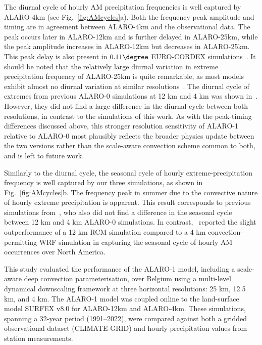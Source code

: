 \documentclass[journal abbreviation, manuscript]{copernicus}
\begin{document}
The diurnal cycle of hourly AM precipitation frequencies is well captured by ALARO-4km (see Fig.~\ref{fig:AMcycles}a).
Both the frequency peak amplitude and timing are in agreement between ALARO-4km and the observational data.
The peak occurs later in ALARO-12km and is further delayed in ALARO-25km, while the peak amplitude increases in ALARO-12km but decreases in ALARO-25km.
This peak delay is also present in $0.11\degree$ EURO-CORDEX simulations~\citep{meredith_present_2021}.
It should be noted that the relatively large diurnal variation in extreme precipitation frequency of ALARO-25km is quite remarkable, as most models exhibit almost no diurnal variation at similar resolutions~\citep{meredith_present_2021, thomassen_spatial_2023}.
The diurnal cycle of extremes from previous ALARO-0 simulations at 12 km and 4 km was shown in~\citet{van_de_vyver_evaluation_2021}. 
However, they did not find a large difference in the diurnal cycle between both resolutions, in contrast to the simulations of this work. 
As with the peak-timing differences discussed above, this stronger resolution sensitivity of ALARO-1 relative to ALARO-0 most plausibly reflects the broader physics update between the two versions rather than the scale-aware convection scheme common to both, and is left to future work.

Similarly to the diurnal cycle, the seasonal cycle of hourly extreme-precipitation frequency is well captured by our three simulations, as shown in Fig.~\ref{fig:AMcycles}b.
The frequency peak in summer due to the convective nature of hourly extreme precipitation is apparent.
This result corresponds to previous simulations from~\citet{van_de_vyver_evaluation_2021}, who also did not find a difference in the seasonal cycle between 12 km and 4 km ALARO-0 simulations.
In contrast,~\citet{innocenti_observed_2019} reported the slight outperformance of a 12 km RCM simulation compared to a 4 km convection-permitting WRF simulation in capturing the seasonal cycle of hourly AM occurrences over North America.

\conclusions  %
\label{sect:conclusions}


This study evaluated the performance of the ALARO-1 model, including a scale-aware deep convection parameterisation, over Belgium using a multi-level dynamical downscaling framework at three horizontal resolutions: 25 km, 12.5 km, and 4 km.
The ALARO-1 model was coupled online to the land-surface model SURFEX v8.0 for ALARO-12km and ALARO-4km.
These simulations, spanning a 32-year period (1991--2022), were compared against both a gridded observational dataset (CLIMATE-GRID) and hourly precipitation values from station measurements.
\end{document}
